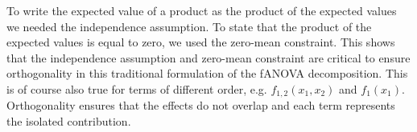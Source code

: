 



To write the expected value of a product as the product of the expected values we needed the independence assumption. To state that the product of the expected values is equal to zero, we used the zero-mean constraint. This shows that the independence assumption and zero-mean constraint are critical to ensure orthogonality in this traditional formulation of the fANOVA decomposition. This is of course also true for terms of different order, e.g. \( f_{1,2}(x_1, x_2) \) and \( f_{1}(x_1) \). Orthogonality ensures that the effects do not overlap and each term represents the isolated contribution.

